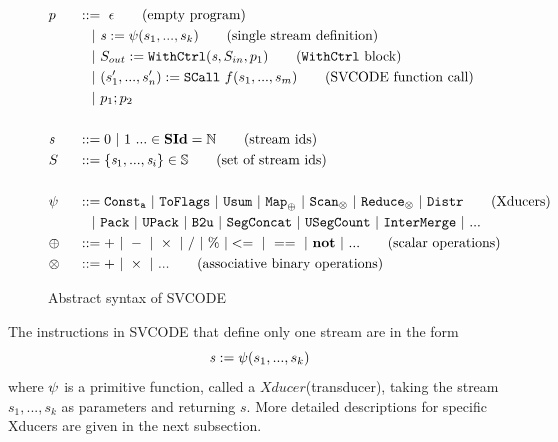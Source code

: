 \begin{figure}[!h] \large
	\begin{alignat*}{2}
	&p  && :: = \ \epsilon \tag{empty program}\\ 
	&   && \quad | \ \sdef{\s}{\psi(s_1,...,s_k)}  \tag{single stream definition}\\
	&   && \quad | \ \withctrl{\s}{p_1}{\Sin}{\Sout}  \tag{\wc block}\\
	&   && \quad | \ \scall{f}{s_1,...,s_m}{(s_1',...,s_n')} \tag{SVCODE function call}\\
	&   && \quad | \ p_1;p_2  \\
	\\
	&\s && ::= 0 \ | \ 1 \ ... \in \SId  = \mathbb{N}   \tag{stream ids}\\
	&  \S && ::= \{\s_1,..., \s_i\} \in \sset  \tag{set of stream ids}\\
	\\
	& \psi \ && ::= \consta{a} \ | \ \toflag  
	\ | \ \usum \ | \ \map{\oplus} \ | \ \genscan_{\otimes} \ | \ \genreduce_{\otimes} \ | \ \distr  \tag{Xducers}  \\
    &   && \quad | \ \pack \ | \ \upack \ | \ \bu \ | \ \segconcat \ | \ \usegcount \ | \ \intermerge \ | \ ...  \\
    & \oplus  \ && :: = + \ | \ - \ | \ \times \ |  \  / \ | \ \% \ | <= \ | \ == \ | \  \*{not} \ | \ ... \tag{scalar operations} \\
    & \otimes \ && :: = + \ | \ \times  \ | \ ...  \tag{associative binary operations} \\
	\end{alignat*}
	\caption{Abstract syntax of SVCODE \label{fig-svcode1-gram}}
\end{figure}


The instructions in SVCODE that define only one stream are in the form
$$\mathit{s} := \psi(s_1,...,s_k) $$  
where $\psi$ is a primitive function, called a $Xducer$(transducer), taking the stream $s_1,...,s_k$ as parameters and returning $s$. 
More detailed descriptions for specific Xducers are given in the next subsection.


